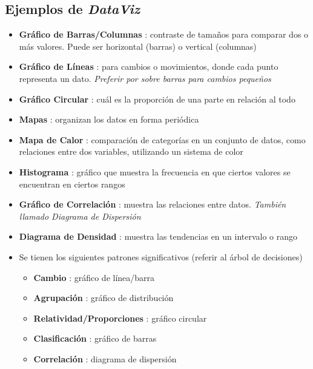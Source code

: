 \subsection{Ejemplos de \textit{DataViz}}
\begin{itemize}
    \item {\textbf{Gráfico de Barras/Columnas} : contraste de tamaños para comparar dos o más valores. Puede ser horizontal (barras) o vertical (columnas)}
    \item {\textbf{Gráfico de Líneas} : para cambios o movimientos, donde cada punto representa un dato. \textit{Preferir por sobre barras para cambios pequeños}}
    \item {\textbf{Gráfico Circular} : cuál es la proporción de una parte en relación al todo}
    \item {\textbf{Mapas} : organizan los datos en forma periódica}
    \item {\textbf{Mapa de Calor} : comparación de categorías en un conjunto de datos, como relaciones entre dos variables, utilizando un sistema de color}
    \item {\textbf{Histograma} : gráfico que muestra la frecuencia en que ciertos valores se encuentran en ciertos rangos}
    \item {\textbf{Gráfico de Correlación} : muestra las relaciones entre datos. \textit{También llamado Diagrama de Dispersión}}
    \item {\textbf{Diagrama de Densidad} : muestra las tendencias en un intervalo o rango}
    \item {Se tienen los siguientes patrones significativos (referir al árbol de decisiones)
    \begin{itemize}
        \item {\textbf{Cambio} : gráfico de línea/barra}
        \item {\textbf{Agrupación} : gráfico de distribución}
        \item {\textbf{Relatividad/Proporciones} : gráfico circular}
        \item {\textbf{Clasificación} : gráfico de barras}
        \item {\textbf{Correlación} : diagrama de dispersión}
    \end{itemize}}
\end{itemize}


